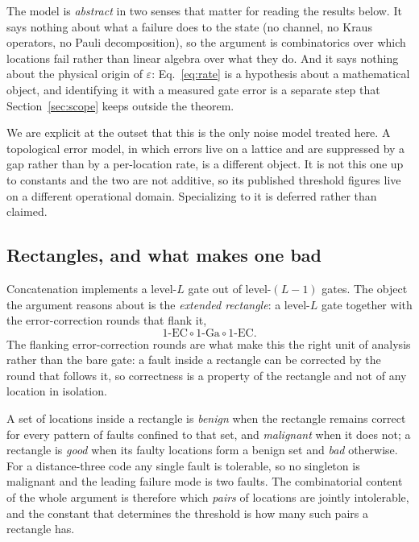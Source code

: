 \documentclass[aps,prx,reprint,nofootinbib,superscriptaddress]{revtex4-2}
\begin{document}
The model is \emph{abstract} in two senses that matter for reading the results
below. It says nothing about what a failure does to the state (no channel, no
Kraus operators, no Pauli decomposition), so the argument is combinatorics over
which locations fail rather than linear algebra over what they do. And it says
nothing about the physical origin of $\varepsilon$: Eq.~\eqref{eq:rate} is a
hypothesis about a mathematical object, and identifying it with a measured gate
error is a separate step that Section~\ref{sec:scope} keeps outside the theorem.

We are explicit at the outset that this is the only noise model treated here. A
topological error model, in which errors live on a lattice and are suppressed by
a gap rather than by a per-location rate, is a different object. It is not this
one up to constants and the two are not additive, so its published threshold
figures live on a different operational domain. Specializing to it is deferred
rather than claimed.

\subsection{Rectangles, and what makes one bad}

Concatenation implements a level-$L$ gate out of level-$(L{-}1)$ gates. The
object the argument reasons about is the \emph{extended rectangle}: a level-$L$
gate together with the error-correction rounds that flank it,
\begin{equation}
  \text{1-EC} \circ \text{1-Ga} \circ \text{1-EC}.
  \label{eq:exrec}
\end{equation}
The flanking error-correction rounds are what make this the right unit of
analysis rather than the bare gate: a fault inside a rectangle can be corrected
by the round that follows it, so correctness is a property of the rectangle and
not of any location in isolation.

A set of locations inside a rectangle is \emph{benign} when the rectangle
remains correct for every pattern of faults confined to that set, and
\emph{malignant} when it does not; a rectangle is \emph{good} when its faulty
locations form a benign set and \emph{bad} otherwise. For a distance-three code
any single fault is tolerable, so no singleton is malignant and the leading
failure mode is two faults. The combinatorial content of the whole argument is
therefore which \emph{pairs} of locations are jointly intolerable, and the
constant that determines the threshold is how many such pairs a rectangle has.
\end{document}
